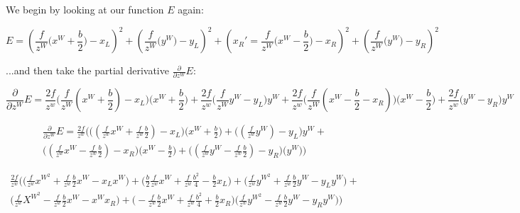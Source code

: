 \documentclass{article}
\begin{document}
\noindent We begin by looking at our function $E$ again:

\begin{equation}
    E = (\frac{f}{z^W}\bigl( x^W + \frac{b}{2} \bigr) - x_L)^2 + (\frac{f}{z^W}\bigl( y^W \bigr) - y_L)^2 + ( x_R'=\frac{f}{z^W}\bigl( x^W - \frac{b}{2} \bigr) - x_R)^2 + (\frac{f}{z^W}\bigl( y^W \bigr) - y_R)^2
\end{equation}

\noindent ...and then take the partial derivative $\frac{\partial}{\partial z^W} E$:

\begin{equation}
    \frac{\partial}{\partial z^W} E = 
    \frac{2f}{z^w}
    \bigl(
        \frac{f}{z^W}(x^W+\frac{b}{2})-x_L
    \bigr)\bigl( x^W + \frac{b}{2} \bigr) + 
    \frac{2f}{z^w} \bigl( \frac{f}{z^W} y^W -y_L \bigr) y^W +
    \frac{2f}{z^w} \bigl(\frac{f}{z^W}(x^W - \frac{b}{2}-x_R) \bigr)\bigl(x^W-\frac{b}{2}\bigr) +
    \frac{2f}{z^w} \bigl(y^W - y_R \bigr)y^W
\end{equation}

\begin{equation}
    \begin{split}
    \frac{\partial}{\partial z^W} E = \frac{2f}{z^w}\biggl(
        \bigl((\frac{f}{z^w}x^W+\frac{f}{z^w}\frac{b}{2})-x_L\bigr)\bigl(x^W+\frac{b}{2}\bigr)+
        \bigl((\frac{f}{z^w}y^W)-y_L\bigr)y^W + \\
        \bigl((\frac{f}{z^w}x^W-\frac{f}{z^w}\frac{b}{2})-x_R\bigr)\bigl(x^W-\frac{b}{2}\bigr)+
        \bigl((\frac{f}{z^w}y^W-\frac{f}{z^w}\frac{b}{2})-y_R\bigr)\bigl(y^W\bigr)
    \biggr)
    \end{split}
\end{equation}

\begin{equation}
    \begin{split}
    \frac{2f}{z^w}\biggl(
        \bigl(\frac{f}{z^w}x^{W^2}+\frac{f}{z^w}\frac{b}{2}x^W-x_Lx^W\bigr)+
        \bigl(\frac{b}{2}\frac{f}{z^w}x^W+\frac{f}{z^w}\frac{b^2}{4}-\frac{b}{2}x_L\bigr) +
        \bigl(\frac{f}{z^w}y^{W^2}+\frac{f}{z^w}\frac{b}{2}y^W-y_Ly^W\bigr)+ \\
        \bigl(\frac{f}{z^w}X^{W^2}-\frac{f}{z^w}\frac{b}{2}x^W-x^Wx_R\bigr) +
        \bigl(-\frac{f}{z^w}\frac{b}{2} x^W + \frac{f}{z^w} \frac{b^2}{4}+\frac{b}{2}x_R\bigr)
        \bigl(\frac{f}{z^w}y^{W^2}-\frac{f}{z^w}\frac{b}{2}y^W-y_Ry^W\bigr)
    \biggr)
    \end{split}
\end{equation}
\end{document}
